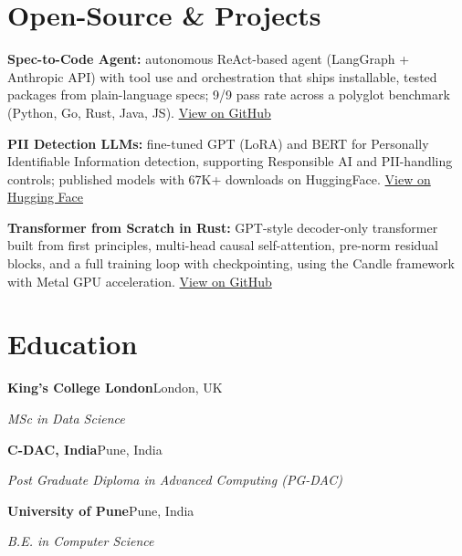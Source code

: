 \documentclass[10pt,a4paper]{article}
\begin{document}
\section{Open-Source \& Projects}
\begin{tight}
  \item \textbf{Spec-to-Code Agent:} autonomous ReAct-based agent (LangGraph + Anthropic API) with tool use and orchestration that ships installable, tested packages from plain-language specs; 9/9 pass rate across a polyglot benchmark (Python, Go, Rust, Java, JS). \href{https://github.com/abhijeetscode/Spec-to-Code-Agent}{View on GitHub}
  \item \textbf{PII Detection LLMs:} fine-tuned GPT (LoRA) and BERT for Personally Identifiable Information detection, supporting Responsible AI and PII-handling controls; published models with 67K+ downloads on HuggingFace. \href{https://huggingface.co/ab-ai/pii_model}{View on Hugging Face}
  \item \textbf{Transformer from Scratch in Rust:} GPT-style decoder-only transformer built from first principles, multi-head causal self-attention, pre-norm residual blocks, and a full training loop with checkpointing, using the Candle framework with Metal GPU acceleration. \href{https://github.com/abhijeetscode/transformer-rust}{View on GitHub}
\end{tight}

\section{Education}
{\color{company}\bfseries King's College London}\hfill {\color{muted}London, UK}\par
{\itshape MSc in Data Science}\par\vspace{1pt}
{\color{company}\bfseries C-DAC, India}\hfill {\color{muted}Pune, India}\par
{\itshape Post Graduate Diploma in Advanced Computing (PG-DAC)}\par\vspace{1pt}
{\color{company}\bfseries University of Pune}\hfill {\color{muted}Pune, India}\par
{\itshape B.E. in Computer Science}\par
\end{document}
